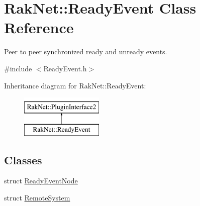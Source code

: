 \hypertarget{class_rak_net_1_1_ready_event}{\section{Rak\-Net\-:\-:Ready\-Event Class Reference}
\label{class_rak_net_1_1_ready_event}
}


Peer to peer synchronized ready and unready events.  




{\ttfamily \#include $<$Ready\-Event.\-h$>$}

Inheritance diagram for Rak\-Net\-:\-:Ready\-Event\-:\begin{figure}[H]
\begin{center}
\leavevmode
\includegraphics[height=2.000000cm]{class_rak_net_1_1_ready_event}
\end{center}
\end{figure}
\subsection*{Classes}
\begin{DoxyCompactItemize}
\item 
struct \hyperlink{struct_rak_net_1_1_ready_event_1_1_ready_event_node}{Ready\-Event\-Node}
\item 
struct \hyperlink{struct_rak_net_1_1_ready_event_1_1_remote_system}{Remote\-System}
\end{DoxyCompactItemize}
